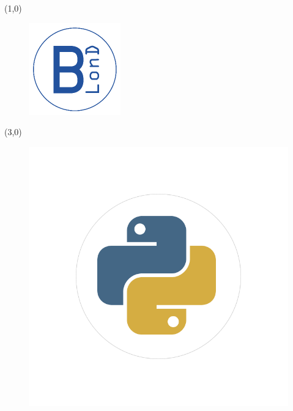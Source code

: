 \begin{frame}
	\begin{textblock}{2}(1,0)
		\begin{figure}
			\includegraphics[width=\textwidth]{figures/BLonD_logo_header}
		\end{figure}
	\end{textblock}
	\begin{textblock}{2}(3,0)
		\begin{figure}
			\includegraphics[width=\textwidth]{figures/python-logo}

\end{figure}
\end{textblock}
\end{frame}
